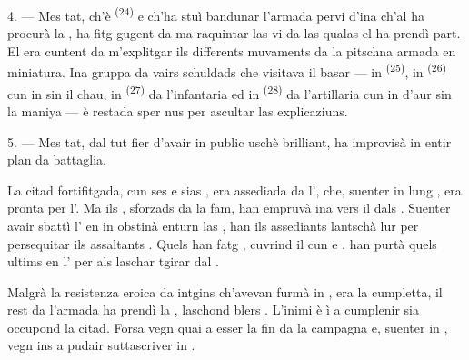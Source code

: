 \VUsaut{4.0mm}
\VUsaut{2.8mm}

4. --- Mes tat, ch'è  \textsuperscript{(24)} e ch'ha stuì bandunar l'armada
pervi d'ina  ch'al ha procurà la , ha fitg
gugent da ma raquintar las  vi da las qualas el ha prendì part. El era
cuntent da m'explitgar ils differents muvaments da la pitschna armada en miniatura.
Ina gruppa da vairs schuldads che visitava il basar --- in 
\textsuperscript{(25)}, in  \textsuperscript{(26)} cun in
 sin il chau, in  \textsuperscript{(27)} da l'infantaria
ed in  \textsuperscript{(28)} da l'artillaria cun in 
d'aur sin la maniya --- è restada sper nus per ascultar las explicaziuns.

5. --- Mes tat, dal tut fier d'avair in public uschè brilliant, ha improvisà in entir
plan da battaglia.

La citad fortifitgada, cun ses  e sias , era assediada da
l', che, suenter in lung , era pronta per
l'. Ma ils , sforzads da la fam, han empruvà ina
 vers il  dals . Suenter avair sbattì
l' en in  obstinà enturn las , han ils
assediants  lantschà lur  per persequitar ils
assaltants . Quels han fatg , cuvrind il  cun  e .  han purtà quels
ultims en l' per als laschar tgirar dal .

Malgrà la resistenza eroica da intgins  ch'avevan furmà in
, era la  cumpletta, il rest da l'armada ha prendì la
, laschond blers . L'inimi è ì a cumplenir sia
 occupond la citad. Forsa vegn quai a esser la fin da la campagna e,
suenter in , vegn ins a pudair suttascriver in .

\VUsaut{4.4mm}
\VUsaut{2.8mm}

